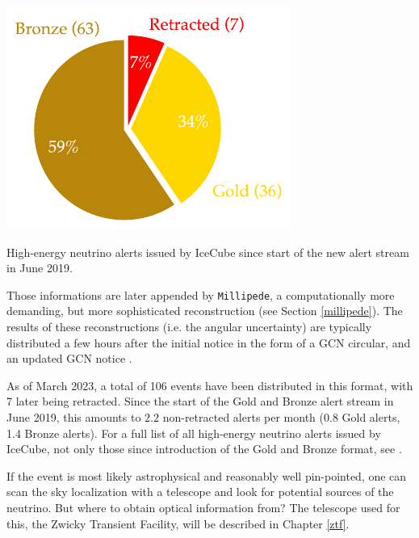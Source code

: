 \documentclass[
    a4paper, %
    fontsize=10pt, %
    twoside=false, %
    numbers=noenddot, %
    fontmethod=tex,
]{kaobook}
\begin{document}
\begin{marginfigure}
    \includegraphics{ic/ic_he_alert_overview.pdf}
    \caption[IceCube alert overview]{High-energy neutrino alerts issued by IceCube since start of the new alert stream in June 2019.}
\end{marginfigure}

Those informations are later appended by \texttt{Millipede}, a computationally more demanding, but more sophisticated reconstruction (see Section \ref{millipede}). The results of these reconstructions (i.e. the angular uncertainty) are typically distributed a few hours after the initial notice in the form of a GCN circular, and an updated GCN notice \cite{Blaufuss2019}.

As of March 2023, a total of 106 events have been distributed in this format, with 7 later being retracted. Since the start of the Gold and Bronze alert stream in June 2019, this amounts to $2.2$ non-retracted alerts per month (0.8 Gold alerts, 1.4 Bronze alerts). For a full list of all high-energy neutrino alerts issued by IceCube, not only those since introduction of the Gold and Bronze format, see \cite{Abbasi2023}.

If the event is most likely astrophysical and reasonably well pin-pointed, one can scan the sky localization with a telescope and look for potential sources of the neutrino. But where to obtain optical information from? The telescope used for this, the Zwicky Transient Facility, will be described in Chapter \ref{ztf}.


% 
% 
% 
% 
% 
\end{document}
